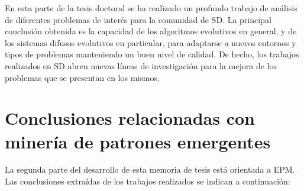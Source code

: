 \documentclass[c5paper,10pt,twoside]{book}	   	%
\begin{document}
En esta parte de la tesis doctoral se ha realizado un profundo trabajo de análisis de diferentes problemas de interés para la comunidad de \ac{SD}. La principal conclusión obtenida es la capacidad de los algoritmos evolutivos en general, y de los sistemas difusos evolutivos en particular, para adaptarse a nuevos entornos y tipos de problemas manteniendo un buen nivel de calidad. De hecho, los trabajos realizados en \ac{SD} abren nuevas líneas de investigación para la mejora de los problemas que se presentan en los mismos.

\section{Conclusiones relacionadas con minería de patrones emergentes}

La segunda parte del desarrollo de esta memoria de tesis está orientada a \ac{EPM}. Las conclusiones extraídas de los trabajos realizados se indican a continuación:
\end{document}
